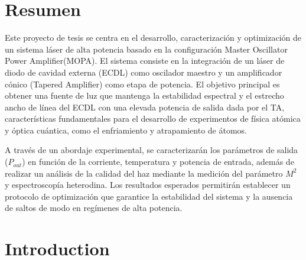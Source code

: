 \documentclass[12pt]{article}
\begin{document}
\clearpage

\fancyfoot[C]{\thepage}

\section{Resumen}
Este proyecto de tesis se centra en el desarrollo, caracterización y optimización de un sistema láser de alta potencia basado en la configuración Master Oscillator Power Amplifier(MOPA). El sistema consiste en la integración de un láser de diodo de cavidad externa (ECDL) como oscilador maestro y un amplificador cónico (Tapered Amplifier) como etapa de potencia. El objetivo principal es obtener una fuente de luz que mantenga la estabilidad espectral y el estrecho ancho de línea del ECDL con una elevada potencia de salida dada por el TA, características fundamentales para el desarrollo de experimentos de física atómica y óptica cuántica, como el enfriamiento y atrapamiento de átomos. 

A través de un abordaje experimental, se caracterizarán los parámetros de salida ($P_{out}$) en función de la corriente, temperatura y potencia de entrada, además de realizar un análisis de la calidad del haz mediante la medición del parámetro $M^2$ y espectroscopía heterodina. Los resultados esperados permitirán establecer un protocolo de optimización que garantice la estabilidad del sistema y la ausencia de saltos de modo en regímenes de alta potencia.
\section{Introduction}
\end{document}
